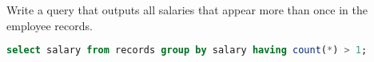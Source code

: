 \question Write a query that outputs all salaries that appear more than once in the employee records.

\begin{solution}[2cm]
\begin{lstlisting}[language=SQL]
select salary from records group by salary having count(*) > 1;
\end{lstlisting}
\end{solution}
